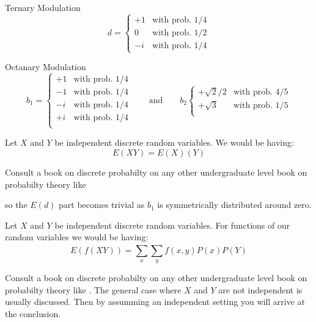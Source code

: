   Ternary Modulation
  \begin{equation*}
	d =
		\begin{cases}
			+1 & \text{with prob.  $1/4$}\\
			0 & \text{with prob.  $1/2$}\\
			-i & \text{with prob.  $1/4$}
		\end{cases}  
  \end{equation*}
  
  
  
  
  
  Octanary Modulation
  \begin{equation*}
	b_1 =
		\begin{cases}
			+1 & \text{with prob.  $1/4$}\\
			-1 & \text{with prob.  $1/4$}\\
			-i & \text{with prob.  $1/4$}\\
			+i & \text{with prob.  $1/4$}\\
  
		\end{cases}  
		\qquad \text{and} \qquad 
	b_2 
		\begin{cases}  
		  +\sqrt{2}/2 & \text{with prob.  $4/5$}\\
		  +\sqrt{3} & \text{with prob.  $1/5$}\\
	  \end{cases}   
  \end{equation*}



\begin{Thm}
	Let $X$ and $Y$ be independent discrete random variables. We would be having:
	\begin{equation*}
		E(XY) = E(X)(Y)
	\end{equation*}
\end{Thm}
\begin{Proof}
Consult a book on discrete probabilty on any other undergraduate level book on probabilty theory like \cite{Chung2003}
\end{Proof}
		
  so the $E(d)$ part becomes trivial as $b_1$ is symmetrically distributed around zero. 

  \begin{Thm}
	Let $X$ and $Y$ be independent discrete random variables. For functions of our random variables we would be having:
	\begin{equation*}
		E(f(XY)) = \sum_{x}^{}\sum_{y}^{}f(x,y)P(x)P(Y)
	\end{equation*}
\end{Thm}
\begin{Proof}
	Consult a book on discrete probabilty on any other undergraduate level book on probabilty theory like \cite{DasGupta2011}.
	The general case where $X$ and $Y$ are not independent is usually discussed. Then by assumming an independent setting 
	you will arrive at the conclusion.
	\end{Proof}



